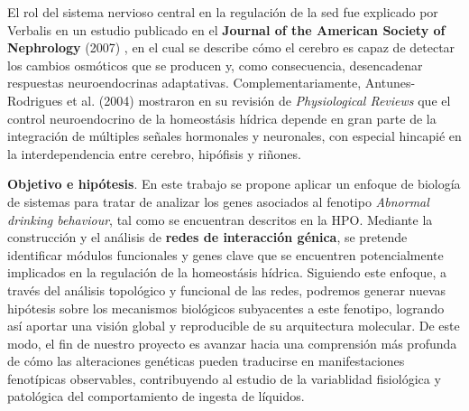 El rol del sistema nervioso central en la regulación de la sed fue explicado por Verbalis en un estudio publicado en el \textbf{Journal of the American Society of Nephrology} (2007) \cite{verbalis2007brain}, en el cual se describe cómo el cerebro es capaz de detectar los cambios osmóticos que se producen y, como consecuencia, desencadenar respuestas neuroendocrinas adaptativas. Complementariamente, Antunes-Rodrigues et al. (2004) \cite{antunes2004neuroendocrine} mostraron en su revisión de \textit{Physiological Reviews} que el control neuroendocrino de la homeostásis hídrica depende en gran parte de la integración de múltiples señales hormonales y neuronales, con especial hincapié en la interdependencia entre cerebro, hipófisis y riñones.

\textbf{Objetivo e hipótesis}. En este trabajo se propone aplicar un enfoque de biología de sistemas para tratar de analizar los genes asociados al fenotipo \textit{Abnormal drinking behaviour}, tal como se encuentran descritos en la HPO. Mediante la construcción y el análisis de \textbf{redes de interacción génica}, se pretende identificar módulos funcionales y genes clave que se encuentren potencialmente implicados en la regulación de la homeostásis hídrica. Siguiendo este enfoque, a través del análisis topológico y funcional de las redes, podremos generar nuevas hipótesis sobre los mecanismos biológicos subyacentes a este fenotipo, logrando así aportar una visión global y reproducible de su arquitectura molecular. De este modo, el fin de nuestro proyecto es avanzar hacia una comprensión más profunda de cómo las alteraciones genéticas pueden traducirse en manifestaciones fenotípicas observables, contribuyendo al estudio de la variablidad fisiológica y patológica del comportamiento de ingesta de líquidos.
